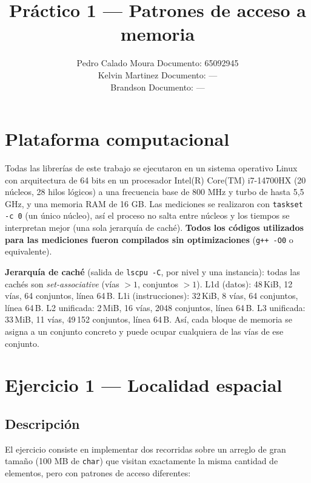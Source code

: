 \documentclass[11pt,a4paper]{article}
\title{Práctico 1 --- Patrones de acceso a memoria}
\author{%
  Pedro Calado Moura \quad Documento: 65092945\\
  Kelvin Martinez \quad Documento: ---\\
  Brandson \quad Documento: ---%
}
\date{}
\begin{document}
\maketitle

\section{Plataforma computacional}

Todas las librerías de este trabajo se ejecutaron en un sistema operativo Linux con arquitectura de 64 bits en un procesador Intel(R) Core(TM) i7-14700HX (20 núcleos, 28 hilos lógicos) a una frecuencia base de 800 MHz y turbo de hasta 5,5 GHz, y una memoria RAM de 16 GB. Las mediciones se realizaron con \texttt{taskset -c 0} (un único núcleo), así el proceso no salta entre núcleos y los tiempos se interpretan mejor (una sola jerarquía de caché). \textbf{Todos los códigos utilizados para las mediciones fueron compilados sin optimizaciones} (\texttt{g++ -O0} o equivalente).

\textbf{Jerarquía de caché} (salida de \texttt{lscpu -C}, por nivel y una instancia): todas las cachés son \textit{set-associative} (vías \(>1\), conjuntos \(>1\)). L1d (datos): 48\,KiB, 12 vías, 64 conjuntos, línea 64\,B. L1i (instrucciones): 32\,KiB, 8 vías, 64 conjuntos, línea 64\,B. L2 unificada: 2\,MiB, 16 vías, 2048 conjuntos, línea 64\,B. L3 unificada: 33\,MiB, 11 vías, 49\,152 conjuntos, línea 64\,B. Así, cada bloque de memoria se asigna a un conjunto concreto y puede ocupar cualquiera de las vías de ese conjunto.

\section{Ejercicio 1 --- Localidad espacial}

\subsection{Descripción}

El ejercicio consiste en implementar dos recorridas sobre un arreglo de gran tamaño (100 MB de \texttt{char}) que visitan exactamente la misma cantidad de elementos, pero con patrones de acceso diferentes:
\end{document}
